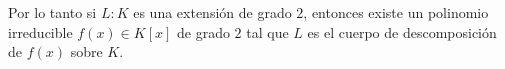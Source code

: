 \begin{solucion}
Por lo tanto si $L:K$ es una extensión de grado $2$, entonces existe un polinomio irreducible $f(x) \in K[x]$ de grado $2$ tal que $L$ es el cuerpo de descomposición de $f(x)$ sobre $K$.


\end{solucion}